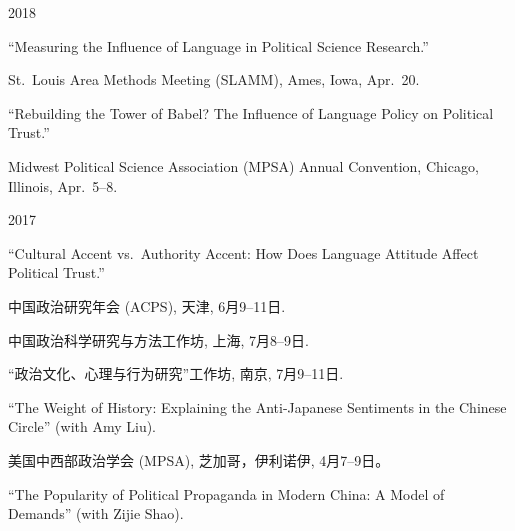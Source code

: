 \documentclass[10.5pt,]{article}
\providecommand{\tightlist}{%
	\setlength{\itemsep}{0pt}\setlength{\parskip}{0pt}}
\renewenvironment{itemize}{
	\begin{list}{}{
			\setlength{\leftmargin}{1.5em}
		}
	}{
	\end{list}
}
\begin{document}
\begin{itemize}
\tightlist
\item
  2018

  \begin{itemize}
  \tightlist
  \item
    ``Measuring the Influence of Language in Political Science
    Research.''

    \begin{itemize}
    \tightlist
    \item
      \footnotesize St.~Louis Area Methods Meeting (SLAMM), Ames, Iowa,
      Apr.~20.
    \end{itemize}
  \item
    ``Rebuilding the Tower of Babel? The Influence of Language Policy on
    Political Trust.''

    \begin{itemize}
    \tightlist
    \item
      \footnotesize Midwest Political Science Association (MPSA) Annual
      Convention, Chicago, Illinois, Apr.~5--8.
    \end{itemize}
  \end{itemize}
\item
  2017

  \begin{itemize}
  \tightlist
  \item
    ``Cultural Accent vs.~Authority Accent: How Does Language Attitude
    Affect Political Trust.''

    \begin{itemize}
    \tightlist
    \item
      \footnotesize 中国政治研究年会 (ACPS), 天津, 6月9--11日.
    \item
      \footnotesize 中国政治科学研究与方法工作坊, 上海, 7月8--9日.
    \item
      \footnotesize ``政治文化、心理与行为研究''工作坊, 南京,
      7月9--11日.
    \end{itemize}
  \item
    ``The Weight of History: Explaining the Anti-Japanese Sentiments in
    the Chinese Circle'' (with Amy Liu).

    \begin{itemize}
    \tightlist
    \item
      \footnotesize 美国中西部政治学会 (MPSA), 芝加哥，伊利诺伊,
      4月7--9日。
    \end{itemize}
  \item
    ``The Popularity of Political Propaganda in Modern China: A Model of
    Demands'' (with Zijie Shao).


\end{itemize}
\end{itemize}
\end{document}
